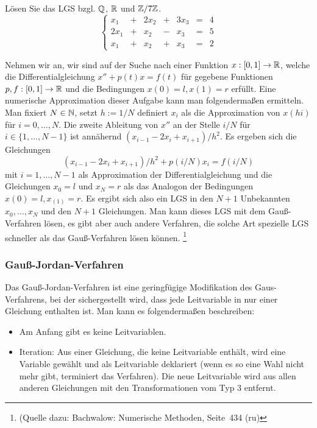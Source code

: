 \begin{bsp}
	Lösen Sie das LGS bzgl. $\mathbb Q$, $\mathbb R$ und $\mathbb Z / 7 \mathbb Z$. 
	\[
	\left\{
	\begin{array}{ccccccc}
		 x_1 &  +&  2 x_2 & + & 3 x_3 &  = & 4
\\		 2 x_1 & + & x_2 & -&  x_3 & =&  5
\\		 x_1 & + & x_2 & + & x_3 & = & 2
	\end{array}\right. 
	\]
\end{bsp} 

\begin{bsp} 
	Nehmen wir an, wir sind auf der Suche nach einer Funktion $x : [0,1] \to \mathbb R$, welche die Differentialgleichung $x'' + p(t) x = f(t)$ für gegebene Funktionen $p, f: [0,1] \to \mathbb R$ und die Bedingungen $x(0) = l , x(1) = r$ erfüllt. Eine numerische Approximation dieser Aufgabe kann man folgendermaßen ermitteln. Man fixiert $N  \in\mathbb N$, setzt $h := 1/ N$ definiert $x_i $ als die Approximation von $x(h i)$ für $i=0,\ldots,N$. Die zweite Ableitung von $x''$ an der Stelle $i/N$ für $i \in \{1,\ldots,N-1\}$ ist annähernd $(x_{i-1} - 2 x_i + x_{i+1})/ h^2$. Es ergeben sich die Gleichungen 
	\[
		 (x_{i-1} - 2 x_i + x_{i+1}) / h^2 + p(i/N) x_i = f(i/N)
	\]
	mit $i=1,\ldots,N-1$ als Approximation der Differentialgleichung und die Gleichungen $x_0= l$ und $x_N = r$ als das Analogon der Bedingungen $x(0)=l, x_(1) =r$. Es ergibt sich also ein LGS in den $N+1$ Unbekannten $x_0,\ldots,x_N$ und den $N+1$ Gleichungen. Man kann dieses LGS mit dem Gauß-Verfahren lösen, es gibt aber auch andere Verfahren, die solche Art spezielle LGS schneller als das Gauß-Verfahren lösen können. \footnote{(Quelle dazu: Bachwalow: Numerische Methoden, Seite~434 (ru)} 
\end{bsp} 

\subsubsection{Gauß-Jordan-Verfahren}

Das Gauß-Jordan-Verfahren ist eine geringfügige Modifikation des Gaus-Verfahrens, bei der sichergestellt wird, dass jede Leitvariable in nur einer Gleichung enthalten ist. Man kann es folgendermaßen beschreiben: 

\begin{framed}
\begin{itemize} 
	\item Am Anfang gibt es keine Leitvariablen. 
	\item Iteration: Aus einer Gleichung, die keine Leitvariable enthält, wird eine Variable gewählt und als Leitvariable deklariert (wenn es so eine Wahl nicht mehr gibt, terminiert das Verfahren). Die neue Leitvariable wird aus allen anderen Gleichungen mit den Transformationen vom Typ 3 entfernt. 
\end{itemize} 
\end{framed} 

